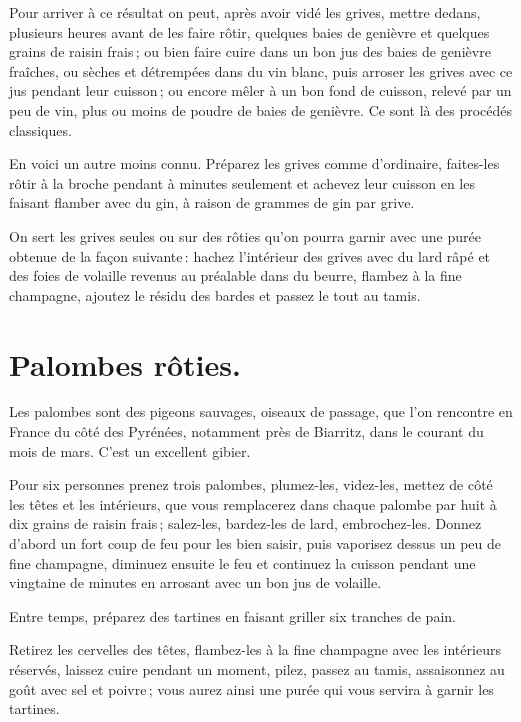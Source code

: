 Pour arriver à ce résultat on peut, après avoir vidé les grives, mettre dedans,
plusieurs heures avant de les faire rôtir, quelques baies de genièvre et
quelques grains de raisin frais ; ou bien faire cuire dans un bon jus des baies
de genièvre fraîches, ou sèches et détrempées dans du vin blanc, puis arroser
les grives avec ce jus pendant leur cuisson ; ou encore mêler à un bon fond de
cuisson, relevé par un peu de vin, plus ou moins de poudre de baies de
genièvre. Ce sont là des procédés classiques.

En voici un autre moins connu. Préparez les grives comme d'ordinaire,
faites-les rôtir à la broche pendant {\mmm} à {\mmm} minutes
seulement et achevez leur cuisson en les faisant flamber avec du gin, à raison
de {\mmm} grammes de gin par grive.

On sert les grives seules ou sur des rôties qu'on pourra garnir avec une purée
obtenue de la façon suivante : hachez l'intérieur des grives avec du lard râpé
et des foies de volaille revenus au préalable dans du beurre, flambez à la fine
champagne, ajoutez le résidu des bardes et passez le tout au tamis.

\section*{\centering Palombes rôties.}
{}

Les palombes sont des pigeons sauvages, oiseaux de passage, que l'on rencontre
en France du côté des Pyrénées, notamment près de Biarritz, dans le courant du
mois de mars. C'est un excellent gibier.

Pour six personnes prenez trois palombes, plumez-les, videz-les, mettez de côté
les têtes et les intérieurs, que vous remplacerez dans chaque palombe par huit
à dix grains de raisin frais ; salez-les, bardez-les de lard, embrochez-les.
Donnez d'abord un fort coup de feu pour les bien saisir, puis vaporisez dessus
un peu de fine champagne, diminuez ensuite le feu et continuez la cuisson
pendant une vingtaine de minutes en arrosant avec un bon jus de volaille.

Entre temps, préparez des tartines en faisant griller six tranches de pain.

Retirez les cervelles des têtes, flambez-les à la fine champagne avec les
intérieurs réservés, laissez cuire pendant un moment, pilez, passez au tamis,
assaisonnez au goût avec sel et poivre ; vous aurez ainsi une purée qui vous
servira à garnir les tartines.

